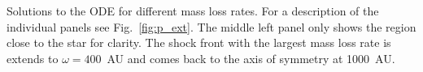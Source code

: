 \label{fig:dot_m}
Solutions to the ODE for different mass loss rates. For a description of the individual panels see Fig.~\ref{fig:p_ext}. The middle left panel only shows the region close to the star for clarity. The shock front with the largest mass loss rate is extends to $\omega=400$~AU and comes back to the axis of symmetry at 1000~AU.
